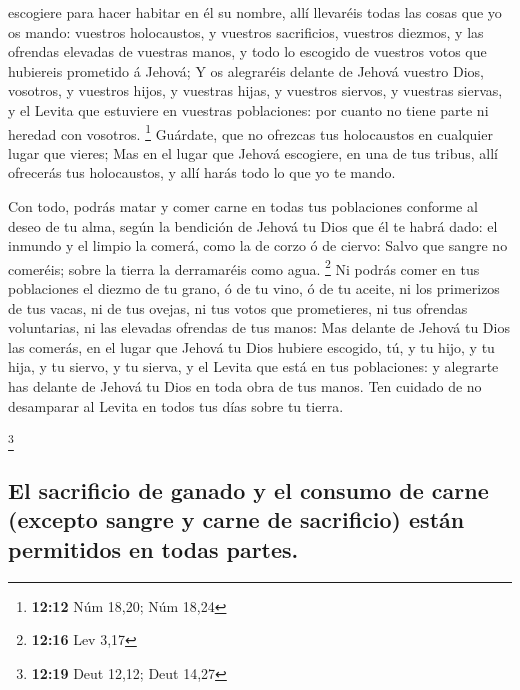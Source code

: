 escogiere para hacer habitar en él su nombre, allí llevaréis todas las
cosas que yo os mando: vuestros holocaustos, y vuestros sacrificios,
vuestros diezmos, y las ofrendas elevadas de vuestras manos, y todo lo
escogido de vuestros votos que hubiereis prometido á Jehová;
 Y os alegraréis delante de Jehová vuestro Dios,
vosotros, y vuestros hijos, y vuestras hijas, y vuestros siervos, y
vuestras siervas, y el Levita que estuviere en vuestras poblaciones: por
cuanto no tiene parte ni heredad con vosotros. \footnote{\textbf{12:12}
  Núm 18,20; Núm 18,24}  Guárdate, que no ofrezcas tus
holocaustos en cualquier lugar que vieres;  Mas en el
lugar que Jehová escogiere, en una de tus tribus, allí ofrecerás tus
holocaustos, y allí harás todo lo que yo te mando.

 Con todo, podrás matar y comer carne en todas tus
poblaciones conforme al deseo de tu alma, según la bendición de Jehová
tu Dios que él te habrá dado: el inmundo y el limpio la comerá, como la
de corzo ó de ciervo:  Salvo que sangre no comeréis;
sobre la tierra la derramaréis como agua. \footnote{\textbf{12:16} Lev
  3,17}  Ni podrás comer en tus poblaciones el diezmo de
tu grano, ó de tu vino, ó de tu aceite, ni los primerizos de tus vacas,
ni de tus ovejas, ni tus votos que prometieres, ni tus ofrendas
voluntarias, ni las elevadas ofrendas de tus manos:  Mas
delante de Jehová tu Dios las comerás, en el lugar que Jehová tu Dios
hubiere escogido, tú, y tu hijo, y tu hija, y tu siervo, y tu sierva, y
el Levita que está en tus poblaciones: y alegrarte has delante de Jehová
tu Dios en toda obra de tus manos.  Ten cuidado de no
desamparar al Levita en todos tus días sobre tu tierra.

\footnote{\textbf{12:19} Deut 12,12; Deut 14,27}

\hypertarget{el-sacrificio-de-ganado-y-el-consumo-de-carne-excepto-sangre-y-carne-de-sacrificio-estuxe1n-permitidos-en-todas-partes.}{%
\subsection{El sacrificio de ganado y el consumo de carne (excepto
sangre y carne de sacrificio) están permitidos en todas
partes.}\label{el-sacrificio-de-ganado-y-el-consumo-de-carne-excepto-sangre-y-carne-de-sacrificio-estuxe1n-permitidos-en-todas-partes.}}


